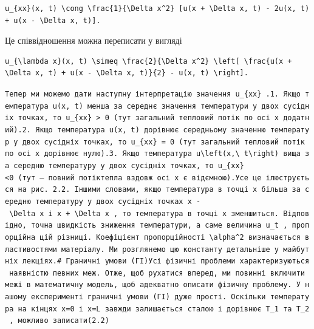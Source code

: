 \documentclass[
  ukrainian,
]{article}
\begin{document}
\begin{verbatim}
u_{xx}(x, t) \cong \frac{1}{\Delta x^2} [u(x + \Delta x, t) - 2u(x, t) + u(x - \Delta x, t)].
\end{verbatim}

Це співвідношення можна переписати у вигляді

\begin{verbatim}
u_{\lambda x}(x, t) \simeq \frac{2}{\Delta x^2} \left[ \frac{u(x + \Delta x, t) + u(x - \Delta x, t)}{2} - u(x, t) \right].
\end{verbatim}

\texttt{Тепер\ ми\ можемо\ дати\ наступну\ інтерпретацію\ значення\ \textquotesingle{}u\_\{xx\}\textquotesingle{}\ .1.\ Якщо\ температура\ \textquotesingle{}u(x,\ t)\textquotesingle{}\ менша\ за\ середнє\ значення\ температури\ у\ двох\ сусідніх\ точках,\ то\ \textquotesingle{}u\_\{xx\}\ \textgreater{}\ 0\textquotesingle{}\ (тут\ загальний\ тепловий\ потік\ по\ осі\ x\ додатний).2.\ Якщо\ температура\ \textquotesingle{}u(x,\ t)\textquotesingle{}\ дорівнює\ середньому\ значенню\ температур\ у\ двох\ сусідніх\ точках,\ то\ \textquotesingle{}u\_\{xx\}\ =\ 0\textquotesingle{}\ (тут\ загальний\ тепловий\ потік\ по\ осі\ x\ дорівнює\ нулю).3.\ Якщо\ температура\ \textquotesingle{}u\textbackslash{}left(x,\textbackslash{}\ t\textbackslash{}right)\textquotesingle{}\ вища\ за\ середню\ температуру\ у\ двох\ сусідніх\ точках,\ то\ \textquotesingle{}u\_\{xx\}\textless{}0\textquotesingle{}\ (тут\ —\ повний\ потіктепла\ вздовж\ осі\ x\ є\ від\textquotesingle{}ємною).Усе\ це\ ілюструється\ на\ рис.\ 2.2.\ Іншими\ словами,\ якщо\ температура\ в\ точці\ x\ більша\ за\ середню\ температуру\ у\ двох\ сусідніх\ точках\ \textquotesingle{}x\ -\ \textbackslash{}Delta\ x\textquotesingle{}\ і\ \textquotesingle{}x\ +\ \textbackslash{}Delta\ x\textquotesingle{}\ ,\ то\ температура\ в\ точці\ x\ зменшиться.\ Відповідно,\ точна\ швидкість\ зниження\ температури,\ а\ саме\ величина\ \textquotesingle{}u\_t\textquotesingle{}\ ,\ пропорційна\ цій\ різниці.\ Коефіцієнт\ пропорційності\ \textquotesingle{}\textbackslash{}alpha\^{}2\textquotesingle{}\ визначається\ властивостями\ матеріалу.\ Ми\ розглянемо\ цю\ константу\ детальніше\ у\ майбутніх\ лекціях.\#\ Граничні\ умови\ (ГІ)Усі\ фізичні\ проблеми\ характеризуються\ наявністю\ певних\ меж.\ Отже,\ щоб\ рухатися\ вперед,\ ми\ повинні\ включити\ межі\ в\ математичну\ модель,\ щоб\ адекватно\ описати\ фізичну\ проблему.\ У\ нашому\ експерименті\ граничні\ умови\ (ГІ)\ дуже\ прості.\ Оскільки\ температура\ на\ кінцях\ x=0\ і\ x=L\ завжди\ залишається\ сталою\ і\ дорівнює\ \textquotesingle{}T\_1\textquotesingle{}\ та\ \textquotesingle{}T\_2\textquotesingle{}\ ,\ можливо\ записати(2.2)}
\end{document}
